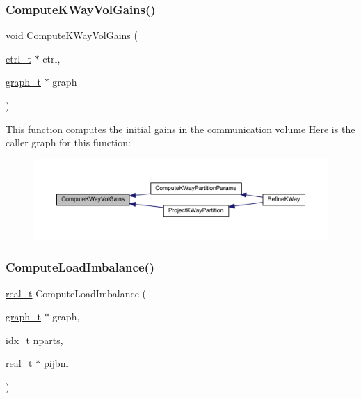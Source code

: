 \subsubsection{\texorpdfstring{Compute\+K\+Way\+Vol\+Gains()}{ComputeKWayVolGains()}}
{\footnotesize\ttfamily void Compute\+K\+Way\+Vol\+Gains (\begin{DoxyParamCaption}\item[{\hyperlink{a00742}{ctrl\+\_\+t} $\ast$}]{ctrl,  }\item[{\hyperlink{a00734}{graph\+\_\+t} $\ast$}]{graph }\end{DoxyParamCaption})}

This function computes the initial gains in the communication volume Here is the caller graph for this function\+:\nopagebreak
\begin{figure}[H]
\begin{center}
\leavevmode
\includegraphics[width=350pt]{a00945_acd248e19a1ba82c235d52479e231e2f7_icgraph}
\end{center}
\end{figure}
\mbox{\label{a00945_a855ba0e639f2f1a3082b1b4695b791aa}} 
\subsubsection{\texorpdfstring{Compute\+Load\+Imbalance()}{ComputeLoadImbalance()}}
{\footnotesize\ttfamily \hyperlink{a00876_a1924a4f6907cc3833213aba1f07fcbe9}{real\+\_\+t} Compute\+Load\+Imbalance (\begin{DoxyParamCaption}\item[{\hyperlink{a00734}{graph\+\_\+t} $\ast$}]{graph,  }\item[{\hyperlink{a00876_aaa5262be3e700770163401acb0150f52}{idx\+\_\+t}}]{nparts,  }\item[{\hyperlink{a00876_a1924a4f6907cc3833213aba1f07fcbe9}{real\+\_\+t} $\ast$}]{pijbm }\end{DoxyParamCaption})}

